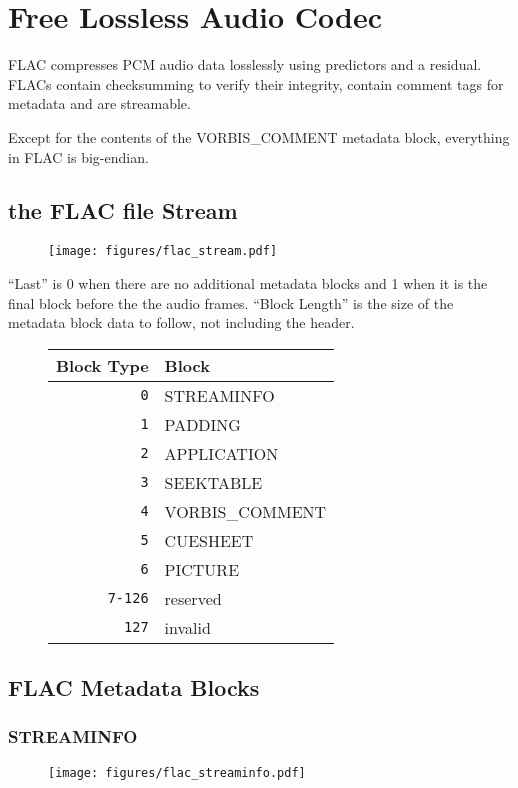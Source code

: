 \chapter{Free Lossless Audio Codec}
FLAC compresses PCM audio data losslessly using predictors and a
residual.
FLACs contain checksumming to verify their integrity, contain comment tags for
metadata and are streamable.

Except for the contents of the VORBIS\_COMMENT metadata block, everything in FLAC is big-endian.

\section{the FLAC file Stream}
\begin{figure}[h]
\texttt{[image: figures/flac\_stream.pdf]}
\end{figure}
\par
\noindent
``Last'' is 0 when there are no additional metadata blocks and 1 when
it is the final block before the the audio frames.
``Block Length'' is the size of the metadata block data to follow,
not including the header.
\begin{figure}[h]
\begin{tabular}{| r | l |}
\hline
Block Type & Block \\
\hline
\texttt{0} & STREAMINFO \\
\texttt{1} & PADDING \\
\texttt{2} & APPLICATION \\
\texttt{3} & SEEKTABLE \\
\texttt{4} & VORBIS\_COMMENT \\
\texttt{5} & CUESHEET \\
\texttt{6} & PICTURE \\
\texttt{7-126} & reserved \\
\texttt{127} & invalid \\
\hline
\end{tabular}
\end{figure}

\pagebreak

\section{FLAC Metadata Blocks}

\subsection{STREAMINFO}
\begin{figure}[h]
\texttt{[image: figures/flac\_streaminfo.pdf]}
\end{figure}

